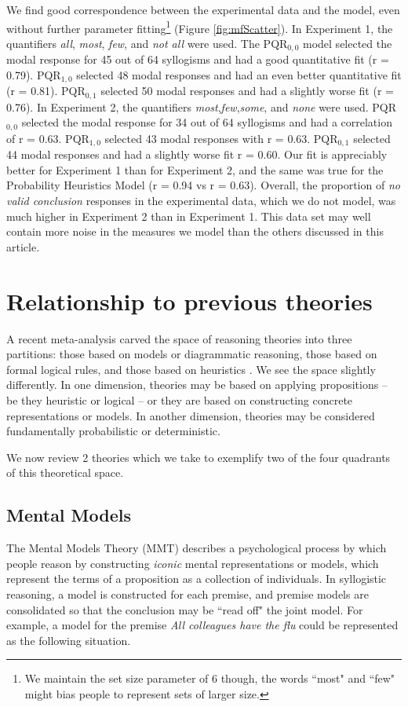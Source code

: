\documentclass[10pt,letterpaper]{article}
\begin{document}
We find good correspondence between the experimental data and the model, even without further parameter fitting\footnote{We maintain the set size parameter of 6 though, the words ``most" and ``few" might bias people to represent sets of larger size.} (Figure \ref{fig:mfScatter}). In Experiment 1, the quantifiers \emph{all}, \emph{most}, \emph{few}, and \emph{not all} were used. The PQR$_{0,0}$ model selected the modal response for 45 out of 64 syllogisms and had a good quantitative fit (r = 0.79).  PQR$_{1,0}$ selected 48 modal responses and had an even better quantitative fit (r = 0.81). PQR$_{0,1}$ selected 50 modal responses and had a slightly worse fit (r = 0.76). 
%
In Experiment 2, the quantifiers \emph{most},\emph{few},\emph{some}, and \emph{none} were used. PQR$_{0,0}$ selected the modal response for 34 out of 64 syllogisms and had a correlation of r = 0.63. PQR$_{1,0}$ selected 43 modal responses with  r = 0.63. PQR$_{0,1}$ selected 44 modal responses and had a slightly worse fit r = 0.60. 
%
Our fit is appreciably better for Experiment 1 than for Experiment 2, and the same was true for the Probability Heuristics Model (r = 0.94 vs r = 0.63). Overall, the proportion of \emph{no valid conclusion} responses in the experimental data, which we do not model, was much higher in Experiment 2 than in Experiment 1. This data set may well contain more noise in the measures we model than the others discussed in this article. 

\section{Relationship to previous theories}

A recent meta-analysis carved the space of reasoning theories into three partitions: those based on models or diagrammatic reasoning, those based on formal logical rules, and those based on heuristics \cite{Khemlani2012}. We see the space slightly differently. In one dimension, theories may be based on applying propositions -- be they heuristic or logical -- or they are based on constructing concrete representations or models. In another dimension, theories may be considered fundamentally probabilistic or deterministic. 

We now review 2 theories which we take to exemplify two of the four quadrants of this theoretical space. 

\subsection{Mental Models}
 The Mental Models Theory (MMT) describes a psychological process by which people reason by constructing {\em iconic} mental representations or models, which represent the terms of a proposition as a collection of individuals. In syllogistic reasoning, a model is constructed for each premise, and premise models are consolidated so that the conclusion may be ``read off" the joint model. For example, a model for the premise  \emph{All colleagues have the flu} could be represented as the following situation.
\end{document}
